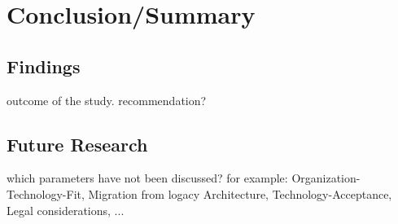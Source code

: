 \chapter{Conclusion/Summary}


\section{Findings}

outcome of the study. recommendation?

\autocite{whatEvEv2017}


\section{Future Research}

which parameters have not been discussed? for example: Organization-Technology-Fit, Migration from logacy Architecture, Technology-Acceptance, Legal considerations, ...
